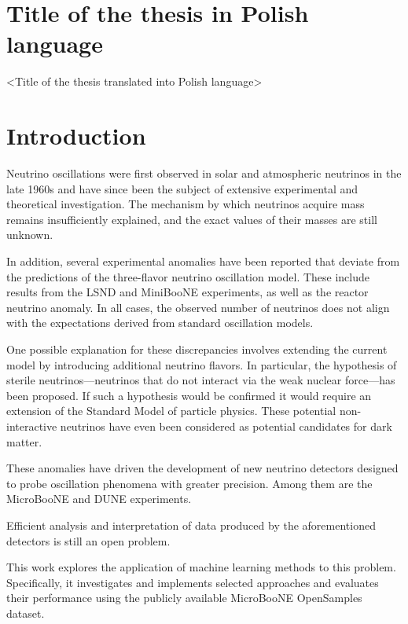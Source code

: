 \documentclass{pracalicmgr}
\begin{document}
\section*{Title of the thesis in Polish language}
<Title of the thesis translated into Polish language>

\newpage


\tableofcontents %
\newpage %

\section{Introduction}

Neutrino oscillations were first observed in solar and atmospheric neutrinos in the late 1960s and have since been the subject of extensive experimental and theoretical investigation. The mechanism by which neutrinos acquire mass remains insufficiently explained, and the exact values of their masses are still unknown.

In addition, several experimental anomalies have been reported that deviate from the predictions of the three-flavor neutrino oscillation model. These include results from the LSND and MiniBooNE experiments, as well as the reactor neutrino anomaly. In all cases, the observed number of neutrinos does not align with the expectations derived from standard oscillation models.

One possible explanation for these discrepancies involves extending the current model by introducing additional neutrino flavors. In particular, the hypothesis of sterile neutrinos—neutrinos that do not interact via the weak nuclear force—has been proposed. If such a hypothesis would be confirmed it would require an extension of the Standard Model of particle physics. These potential non-interactive neutrinos have even been considered as potential candidates for dark matter.

These anomalies have driven the development of new neutrino detectors designed to probe oscillation phenomena with greater precision. Among them are the MicroBooNE and DUNE experiments.

Efficient analysis and interpretation of data produced by the aforementioned detectors is still an open problem.

This work explores the application of machine learning methods to this problem. Specifically, it investigates and implements selected approaches and evaluates their performance using the publicly available MicroBooNE OpenSamples dataset.
\end{document}
